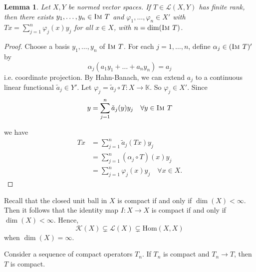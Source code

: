 \documentclass[justified]{tufte-book}
\theoremstyle{plain}%
\newtheorem{lem}[thm]{Lemma}
\theoremstyle{definition}
\theoremstyle{remark}
\newcommand{\K}{\mathbb{K}}
\renewcommand{\phi}{\varphi}
\newcommand{\im}{\textsc{Im\ }}
\begin{document}
\begin{lem}
  Let $X, Y$ be normed vector spaces.  If $T \in \mathcal L(X,Y)$ has finite rank, then there exists $y_1, \dots, y_n \in \im T$ and $\phi_1, \dots, \phi_n \in X'$ with $Tx = \sum_{j=1}^n \phi_j(x) y_j$ for all $x \in X$, with $n = \dim( \im T)$. 
\end{lem}

\begin{proof}
  Choose a basis $y_1, \dots, y_n$ of $\im T$.  For each $j = 1, \dots, n$, define $\alpha_j \in (\im T)'$ by \[
      \alpha_j(a_1 y_1 + \dots + a_n y_n) = a_j
  \] i.e. coordinate projection.  By Hahn-Banach, we can extend $a_j$ to a continuous linear functional $\tilde a_j \in Y'$.  Let $\phi_j = \tilde a_j \circ T : X \rightarrow \K$.  So $\phi_j \in X'$.  Since \[
       y = \sum_{j=1}^n \tilde a_j(y) y_j \quad \forall y \in \im T
  \] 
  
  we have \begin{align*}
      Tx  &= \sum_{j= 1}^n \tilde a_j (Tx) y_j \\
          &= \sum_{j=1}^n (\alpha_j \circ T)(x) y_j    \\
          &= \sum_{j=1}^n \phi_j(x) y_j \quad \forall x \in X.
  \end{align*}
\end{proof}



Recall that the closed unit ball in $X$ is compact if and only if $\dim(X) < \infty$.  Then it follows that the identity map $I : X \rightarrow X$ is compact if and only if $\dim(X) < \infty$.  Hence, \[
  \mathcal K(X) \subsetneq \mathcal L(X) \subsetneq \text{Hom}(X, X) 
\] when $\dim(X) = \infty$.    

Consider a sequence of compact operators $T_n$.  If $T_n$ is compact and $T_n \rightarrow T$, then $T$ is compact.  
\end{document}
